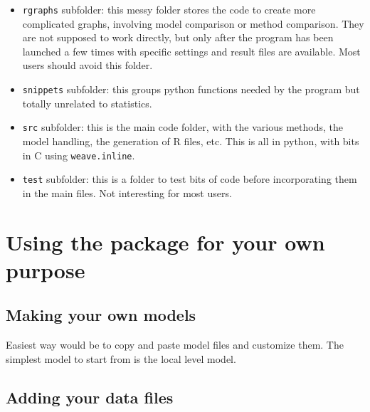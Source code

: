 \documentclass[a4paper,10pt]{paper}
\begin{document}
\begin{itemize}
 \item \texttt{rgraphs} subfolder: this messy folder stores the code to create more complicated graphs, involving model comparison or method comparison. They are not supposed to work directly, but only after the program has been launched a few times with specific settings and result files are available. Most users should avoid this folder.
 \item \texttt{snippets} subfolder: this groups python functions needed by the program but totally unrelated to statistics.
 \item \texttt{src} subfolder: this is the main code folder, with the various methods, the model handling, the generation of R files, etc. This is 
all in python, with bits in C using \texttt{weave.inline}.
 \item \texttt{test} subfolder: this is a folder to test bits of code before incorporating them in the main files. Not interesting for most users.
\end{itemize}


\section{Using the package for your own purpose}

\subsection{Making your own models}

Easiest way would be to copy and paste model files and customize them. The simplest model to start from is the local level model.

\subsection{Adding your data files}
\end{document}
